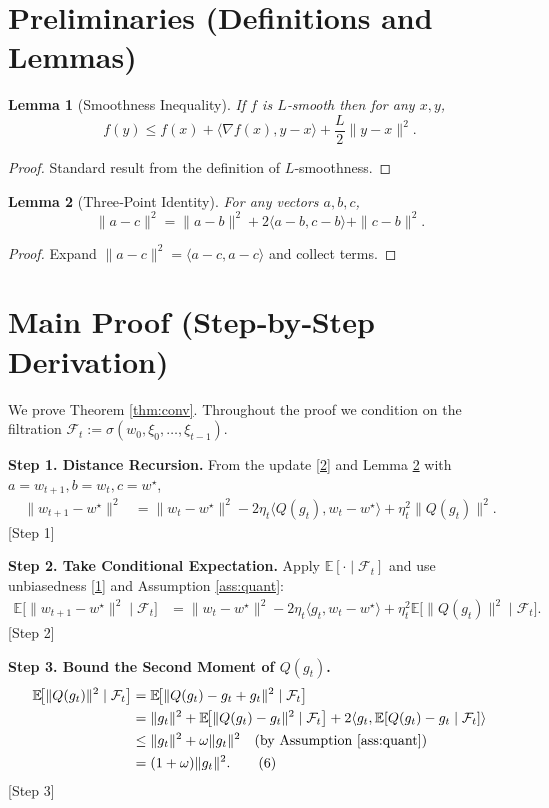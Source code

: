 \documentclass{article}
\newtheorem{lemma}{Lemma}
\begin{document}
\newpage
\section*{Preliminaries (Definitions and Lemmas)}
\begin{lemma}[Smoothness Inequality]\label{lem:smooth}
If $f$ is $L$‑smooth then for any $x,y$,
\[
f(y)\le f(x)+\langle \nabla f(x),y-x\rangle+\frac{L}{2}\|y-x\|^{2}.
\]
\end{lemma}
\begin{proof}
Standard result from the definition of $L$‑smoothness. \qedhere
\end{proof}

\begin{lemma}[Three‑Point Identity]\label{lem:3pt}
For any vectors $a,b,c$,
\[
\|a-c\|^{2}= \|a-b\|^{2}+2\langle a-b,c-b\rangle+\|c-b\|^{2}.
\]
\end{lemma}
\begin{proof}
Expand $\|a-c\|^{2}=\langle a-c,a-c\rangle$ and collect terms. \qedhere
\end{proof}

\section*{Main Proof (Step‑by‑Step Derivation)}
We prove Theorem \ref{thm:conv}. Throughout the proof we condition on the filtration
$\mathcal{F}_t:=\sigma(w_0,\xi_0,\dots,\xi_{t-1})$.

\noindent\textbf{Step 1. Distance Recursion.}  
From the update \eqref{2} and Lemma \ref{lem:3pt} with $a=w_{t+1}, b=w_t, c=w^{\star}$,
\begin{align}
\|w_{t+1}-w^{\star}\|^{2}
&= \|w_t-w^{\star}\|^{2}
-2\eta_t\langle Q(g_t),w_t-w^{\star}\rangle
+\eta_t^{2}\|Q(g_t)\|^{2}. \tag{4}
\end{align}
[Step 1]

\noindent\textbf{Step 2. Take Conditional Expectation.}  
Apply $\mathbb{E}[\cdot\mid\mathcal{F}_t]$ and use unbiasedness \eqref{1} and Assumption \ref{ass:quant}:
\begin{align}
\mathbb{E}\!\big[\|w_{t+1}-w^{\star}\|^{2}\mid\mathcal{F}_t\big]
&= \|w_t-w^{\star}\|^{2}
-2\eta_t\langle g_t,w_t-w^{\star}\rangle
+\eta_t^{2}\mathbb{E}\!\big[\|Q(g_t)\|^{2}\mid\mathcal{F}_t\big]. \tag{5}
\end{align}
[Step 2]

\noindent\textbf{Step 3. Bound the Second Moment of $Q(g_t)$.}  
\[
\begin{aligned}
\mathbb{E}\!\big[\|Q(g_t)\|^{2}\mid\mathcal{F}_t\big]
&= \mathbb{E}\!\big[\|Q(g_t)-g_t+g_t\|^{2}\mid\mathcal{F}_t\big] \\
&= \|g_t\|^{2}
+\mathbb{E}\!\big[\|Q(g_t)-g_t\|^{2}\mid\mathcal{F}_t\big]
+2\langle g_t,\mathbb{E}[Q(g_t)-g_t\mid\mathcal{F}_t]\rangle\\
&\le \|g_t\|^{2}+\omega\|g_t\|^{2}\quad\text{(by Assumption \ref{ass:quant})}\\
&= (1+\omega)\|g_t\|^{2}. \tag{6}
\end{aligned}
\]
[Step 3]
\end{document}
